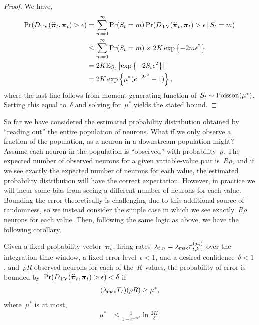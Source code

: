 \begin{proof}
  We have, 
  \begin{align}
    \Pr({D_{\mathrm{TV}}}(\widehat{\boldsymbol{\pi}}_t, \boldsymbol{\pi}_t) > \epsilon) 
    &= \sum_{m=0}^\infty \Pr(S_t=m) \Pr({D_{\mathrm{TV}}}(\widehat{\boldsymbol{\pi}}_t, \boldsymbol{\pi}_t) > \epsilon \,|\, S_t=m) \\
    &\leq \sum_{m=0}^\infty  \Pr(S_t=m) \times 2K \exp \left \{-2m\epsilon^2 \right\} \\
    &= 2K \mathbb{E}_{S_t} \left[ \exp \left \{ -2S_t \epsilon^2 \right \} \right] \\
    &= 2K \exp \left \{\mu^* (e^{-2\epsilon^2}-1) \right\},
  \end{align}
  where the last line follows from moment generating function of~${S_t \sim \mathrm{Poisson}(\mu^*)}$.
  Setting this equal to~$\delta$ and solving for~$\mu^*$ yields the stated bound.
\end{proof}


So far we have considered the estimated probability distribution
obtained by ``reading out'' the entire population of neurons. What if
we only observe a fraction of the population, as a neuron in a
downstream population might? Assume each neuron in the population is 
``observed'' with probability~$\rho$. The expected number of observed 
neurons for a given variable-value pair is~$R\rho$, and if we see 
exactly the expected number of neurons for each value, the estimated 
probability distribution will have the correct expectation. However, 
in practice we will incur some bias from seeing a different number of 
neurons for each value. Bounding the error theoretically is challenging 
due to this additional source of randomness, so we instead consider 
the simple case in which we see exactly~$R \rho$ neurons for each value.
Then, following the same logic as above, we have the following 
corollary.

\begin{corollary}
  \label{cor:sparse_bounds}
  Given a fixed probability vector~$\boldsymbol{\pi}_t$, firing
  rates~$\lambda_{t,n} = \lambda_{\mathsf{max}} \pi_{t,k_n}^{(j_n)}$ over the
  integration time window, a fixed error level~$\epsilon < 1$, and a
  desired confidence~$\delta < 1$, and~$\rho R$ observed neurons for
  each of the~$K$ values, the probability of error is bounded
  by~$\Pr({D_{\mathrm{TV}}}(\widehat{\boldsymbol{\pi}}_t, \boldsymbol{\pi}_t) > \epsilon) < \delta$ if
  \begin{align}
    (\lambda_{\mathsf{max}} T_I) (\rho R) \geq \mu^*,
  \end{align} 
  where~$\mu^*$ is at most,
  \begin{align}
    \mu^* &\leq \frac{1}{1-e^{-2\epsilon^2}} \ln \frac{2K}{\delta}.  
  \end{align}
\end{corollary}

